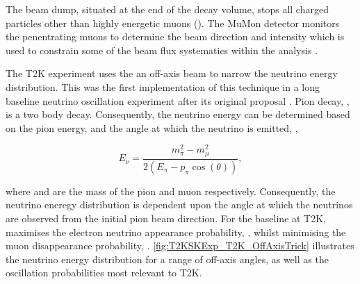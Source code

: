 The beam dump, situated at the end of the decay volume, stops all charged particles other than highly energetic muons (). The MuMon detector monitors the penentrating muons to determine the beam direction and intensity which is used to constrain some of the beam flux systematics within the analysis \cite{MuMon, Vladisavljevic2020-gv}. 

The T2K experiment uses the an off-axis beam to narrow the neutrino energy distribution. This was the first implementation of this technique in a long baseline neutrino oscillation experiment after its original proposal \cite{Beavis1995-qf}. Pion decay, \quickmath{\pi \rightarrow \mu + \nu_\mu}, is a two body decay. Consequently, the neutrino energy  can be determined based on the pion energy,  and the angle at which the neutrino is emitted, \quickmath{\theta},

\begin{equation}
  E_\nu = \frac{m^{2}_{\pi} - m^{2}_{\mu}}{2\left(E_\pi - p_\pi \cos(\theta) \right)},
\end{equation}

where  and  are the mass of the pion and muon respectively. Consequently, the neutrino eneregy distribution is dependent upon the angle at which the neutrinos are observed from the initial pion beam direction. For the  baseline at T2K,  maximises the electron neutrino appearance probability, , whilst minimising the muon disappearance probability, . \autoref{fig:T2KSKExp_T2K_OffAxisTrick} illustrates the neutrino energy distribution for a range of off-axis angles, as well as the oscillation probabilities most relevant to T2K.

